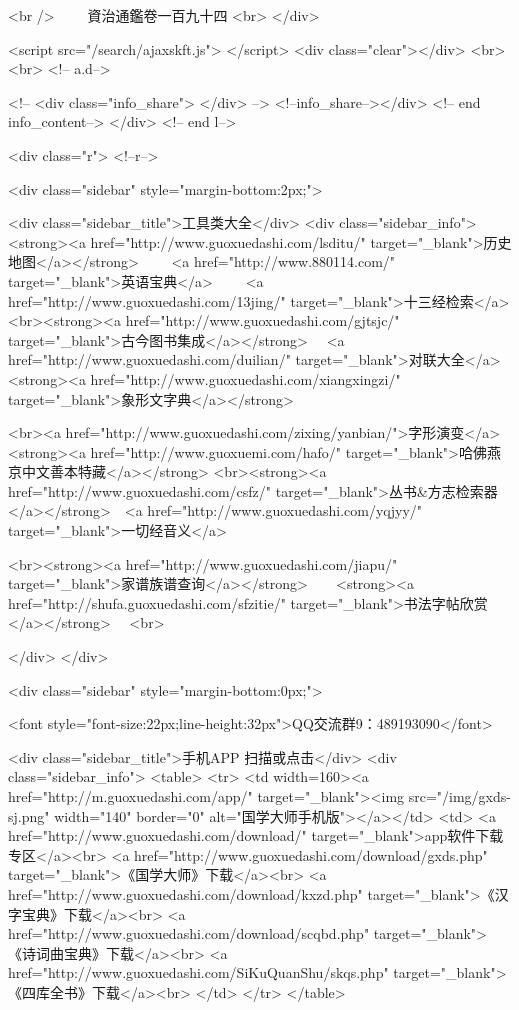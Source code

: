 <br />
　　資治通鑑卷一百九十四  <br>
   </div> 

<script src="/search/ajaxskft.js"> </script>
 <div class="clear"></div>
<br>
<br>
 <!-- a.d-->

 <!--
<div class="info_share">
</div> 
-->
 <!--info_share--></div>   <!-- end info_content-->
  </div> <!-- end l-->

<div class="r">   <!--r-->



<div class="sidebar"  style="margin-bottom:2px;">

 
<div class="sidebar_title">工具类大全</div>
<div class="sidebar_info">
<strong><a href="http://www.guoxuedashi.com/lsditu/" target="_blank">历史地图</a></strong>　　
<a href="http://www.880114.com/" target="_blank">英语宝典</a>　　
<a href="http://www.guoxuedashi.com/13jing/" target="_blank">十三经检索</a>　
<br><strong><a href="http://www.guoxuedashi.com/gjtsjc/" target="_blank">古今图书集成</a></strong>　
<a href="http://www.guoxuedashi.com/duilian/" target="_blank">对联大全</a>　<strong><a href="http://www.guoxuedashi.com/xiangxingzi/" target="_blank">象形文字典</a></strong>　

<br><a href="http://www.guoxuedashi.com/zixing/yanbian/">字形演变</a>　　<strong><a href="http://www.guoxuemi.com/hafo/" target="_blank">哈佛燕京中文善本特藏</a></strong>
<br><strong><a href="http://www.guoxuedashi.com/csfz/" target="_blank">丛书&方志检索器</a></strong>　<a href="http://www.guoxuedashi.com/yqjyy/" target="_blank">一切经音义</a>　　

<br><strong><a href="http://www.guoxuedashi.com/jiapu/" target="_blank">家谱族谱查询</a></strong>　　<strong><a href="http://shufa.guoxuedashi.com/sfzitie/" target="_blank">书法字帖欣赏</a></strong>　
<br>

</div>
</div>


<div class="sidebar" style="margin-bottom:0px;">

<font style="font-size:22px;line-height:32px">QQ交流群9：489193090</font>


<div class="sidebar_title">手机APP 扫描或点击</div>
<div class="sidebar_info">
<table>
<tr>
	<td width=160><a href="http://m.guoxuedashi.com/app/" target="_blank"><img src="/img/gxds-sj.png" width="140"  border="0" alt="国学大师手机版"></a></td>
	<td>
<a href="http://www.guoxuedashi.com/download/" target="_blank">app软件下载专区</a><br>
<a href="http://www.guoxuedashi.com/download/gxds.php" target="_blank">《国学大师》下载</a><br>
<a href="http://www.guoxuedashi.com/download/kxzd.php" target="_blank">《汉字宝典》下载</a><br>
<a href="http://www.guoxuedashi.com/download/scqbd.php" target="_blank">《诗词曲宝典》下载</a><br>
<a href="http://www.guoxuedashi.com/SiKuQuanShu/skqs.php" target="_blank">《四库全书》下载</a><br>
</td>
</tr>
</table>

